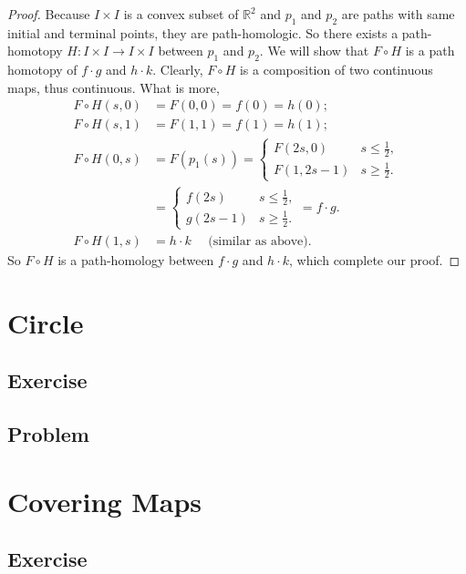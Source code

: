\documentclass[12pt, a4paper]{article}
\theoremstyle{plain}
\newcommand{\R}{\mathbb{R}}
\begin{document}
\begin{proof}
        Because $I\times I$ is a convex subset of $\R^2$ and $p_1$ and $p_2$ are paths with same initial and terminal points, they are path-homologic. So there exists a path-homotopy $H\colon I\times I \to I\times I$ between $p_1$ and $p_2$. We will show that $F\circ H$ is a path homotopy of $f\cdot g$ and $h\cdot k$. Clearly, $F\circ H$ is a composition of two continuous maps, thus continuous. What is more,
        \begin{align*}
            F\circ H(s,0) &= F(0,0) = f(0) = h(0);\\
            F\circ H(s,1) &= F(1,1) = f(1) = h(1);\\
            F\circ H(0,s) &= F(p_1(s))=\begin{cases}
            F(2s,0) & s\leq \frac{1}{2},\\
            F(1,2s-1) & s\geq \frac{1}{2}.
        \end{cases}\\&=\begin{cases}
            f(2s) & s\leq \frac{1}{2},\\
            g(2s-1) & s\geq \frac{1}{2}.
        \end{cases} = f\cdot g.\\
            F\circ H(1,s) & = h\cdot k \quad \text{ (similar as above)}.
        \end{align*}
        So $F\circ H$ is a path-homology between $f\cdot g$ and $h\cdot k$, which complete our proof.
    \end{proof}

\section{Circle}

\subsection{Exercise}


\subsection{Problem}



\setcounter{section}{10}
\section{Covering Maps}

\subsection{Exercise}
\end{document}
